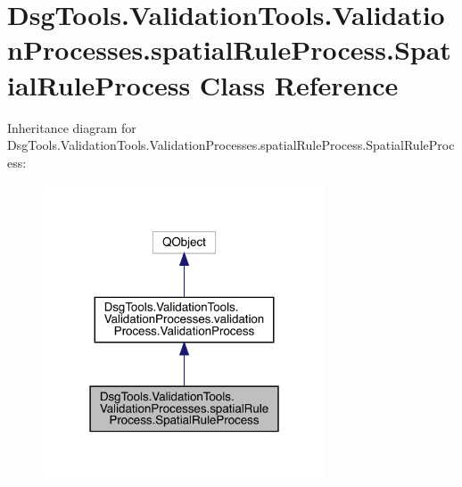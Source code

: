 \hypertarget{class_dsg_tools_1_1_validation_tools_1_1_validation_processes_1_1spatial_rule_process_1_1_spatial_rule_process}{}\section{Dsg\+Tools.\+Validation\+Tools.\+Validation\+Processes.\+spatial\+Rule\+Process.\+Spatial\+Rule\+Process Class Reference}
\label{class_dsg_tools_1_1_validation_tools_1_1_validation_processes_1_1spatial_rule_process_1_1_spatial_rule_process}


Inheritance diagram for Dsg\+Tools.\+Validation\+Tools.\+Validation\+Processes.\+spatial\+Rule\+Process.\+Spatial\+Rule\+Process\+:
\nopagebreak
\begin{figure}[H]
\begin{center}
\leavevmode
\includegraphics[width=238pt]{class_dsg_tools_1_1_validation_tools_1_1_validation_processes_1_1spatial_rule_process_1_1_spatial_rule_process__inherit__graph}
\end{center}
\end{figure}


